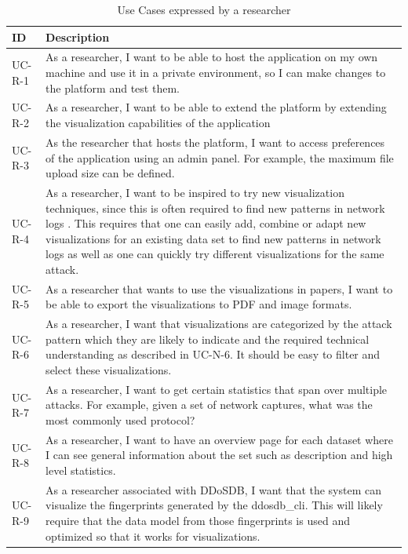 \begin{table}[]
\centering
\begin{tabular}{|p{1.6cm}|p{12cm}|}
\hline
\textbf{ID} & \textbf{Description} \\ \hline

UC-R-1        & As a researcher, I want to be able to host the application on my own machine and use it in a private environment, so I can make changes to the platform and test them.\\ \hline
UC-R-2         & As a researcher, I want to be able to extend the platform by extending the visualization capabilities of the application\\ \hline
UC-R-3        & As the researcher that hosts the platform, I want to access preferences of the application using an admin panel. For example, the maximum file upload size can be defined.\\ \hline
UC-R-4       & As a researcher, I want to be inspired to try new visualization techniques, since this is often required to find new patterns in network logs \cite{appliedsecurityvisualization}. This requires that one can easily add, combine or adapt new visualizations for an existing data set to find new patterns in network logs as well as one can quickly try different visualizations for the same attack.\\ \hline
UC-R-5       & As a researcher that  wants to use the visualizations in papers, I want to be able to export the visualizations to PDF and image formats.\\ \hline
UC-R-6       & As a researcher, I want that visualizations are categorized by the attack pattern which they are likely to indicate and the required technical understanding as described in UC-N-6. It should be easy to filter and select these visualizations.\\ \hline
UC-R-7      & As a researcher, I want to get certain statistics that span over multiple attacks. For example, given a set of network captures, what was the most commonly used protocol?\\ \hline
UC-R-8      & As a researcher, I want to have an overview page for each dataset where I can see general information about the set such as description and high level statistics.\\ \hline
UC-R-9     & As a researcher associated with DDoSDB, I want that the system can visualize the fingerprints generated by the ddosdb\_cli. This will likely require that the data model from those fingerprints is used and optimized so that it works for visualizations. \\ \hline
\end{tabular}
\caption{Use Cases expressed by a researcher}
\label{table:us-researcher}
\end{table} 

